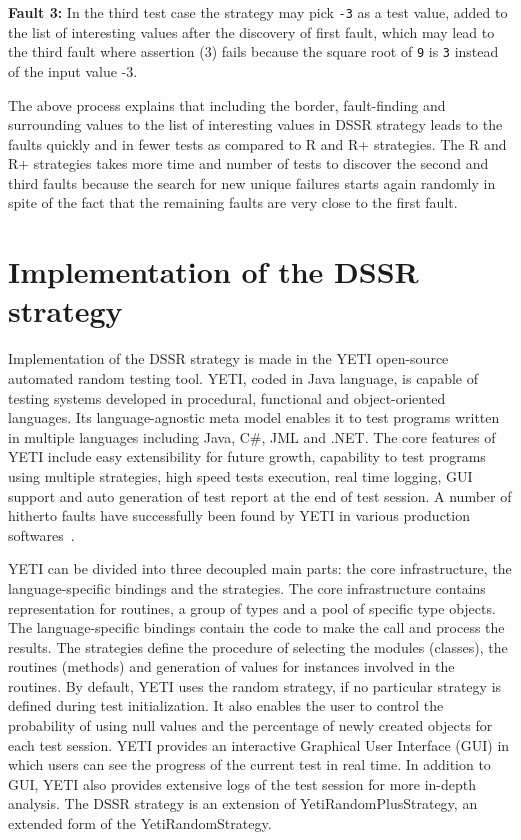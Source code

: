 \documentclass[conference]{IEEEtran}
\begin{document}
\indent \textbf{Fault 3:} In the third test case the strategy may pick \verb+-3+ as a test value, added to the list of interesting values after the discovery of first fault, which may lead to the third fault where assertion (3) fails because the square root of \verb+9+ is \verb+3+ instead of the input value -3.



The above process explains that including the border, fault-finding and surrounding values to the list of interesting values in DSSR strategy leads to the faults quickly and in fewer tests as compared to R and R+ strategies. The R and R+ strategies takes more time and number of tests to discover the second and third faults because the search for new unique failures starts again randomly in spite of the fact that the remaining faults are very close to the first fault.




\section{Implementation of the DSSR \\ strategy}\label{sec:imp}

Implementation of the DSSR strategy is made in the YETI open-source automated random testing tool. YETI, coded in Java language, is capable of testing systems developed in procedural, functional and object-oriented languages. Its language-agnostic meta model enables it to test programs written in multiple languages including Java, C\#, JML and .NET. The core features of YETI include easy extensibility for future growth, capability to test programs using multiple strategies, high speed tests execution, real time logging, GUI support and auto generation of test report at the end of test session. A number of hitherto faults have successfully been found by YETI in various production softwares~\cite{Oriol2012, Oriol2011}.

YETI can be divided into three decoupled main parts: the core infrastructure, the language-specific bindings and the strategies. The core infrastructure contains representation for routines, a group of types and a pool of specific type objects. The language-specific bindings contain the code to make the call and process the results. The strategies define the procedure of selecting the modules (classes), the routines (methods) and generation of values for instances involved in the routines. By default, YETI uses the random strategy, if no particular strategy is defined during test initialization. It also enables the user to control the probability of using null values and the percentage of newly created objects for each test session. YETI provides an interactive Graphical User Interface (GUI) in which users can see the progress of the current test in real time. In addition to GUI, YETI also provides extensive logs of the test session for more in-depth analysis. The DSSR strategy is an extension of YetiRandomPlusStrategy, an extended form of the YetiRandomStrategy. 
\end{document}
